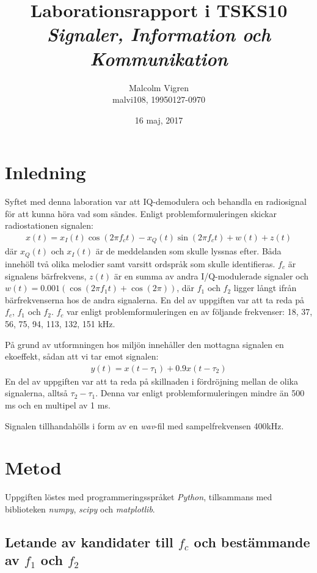 \documentclass[10pt,twocolumn]{article}
\title{Laborationsrapport i TSKS10 \emph{Signaler, Information och Kommunikation}}
\author{Malcolm Vigren \\ malvi108, 19950127-0970 }
\date{16 maj, 2017}
\begin{document}
\maketitle

\section{Inledning}

Syftet med denna laboration var att IQ-demodulera och behandla en radiosignal
för att kunna höra vad som sändes. Enligt problemformuleringen skickar
radiostationen signalen:
\begin{align*}
    x(t) = x_I(t)\cos(2 \pi f_c t) - x_Q(t)\sin(2 \pi f_c t) + w(t) + z(t)
\end{align*}
där $x_Q(t)$ och $x_I(t)$ är de meddelanden som skulle lyssnas efter. 
Båda innehöll två olika melodier samt varsitt ordspråk som skulle identifieras.
$f_c$ är signalens bärfrekvens, $z(t)$ är en summa av andra I/Q-modulerade
signaler och $w(t) = 0.001(\cos(2 \pi f_1 t) + \cos(2 \pi))$, där $f_1$ och
$f_2$ ligger långt ifrån bärfrekvenserna hos de andra signalerna. En del av
uppgiften var att ta reda på $f_c$, $f_1$ och $f_2$. $f_c$ var enligt
problemformuleringen en av följande frekvenser: 18, 37, 56, 75, 94, 113,
132, 151 kHz.

På grund av utformningen hos miljön innehåller den mottagna signalen en
ekoeffekt, sådan att vi tar emot signalen:
\begin{align*}
    y(t) = x(t - \tau_1) + 0.9x(t - \tau_2)
\end{align*}
En del av uppgiften var att ta reda på skillnaden i fördröjning mellan 
de olika signalerna,
alltså $\tau_2 - \tau_1$. Denna var enligt problemformuleringen mindre än 500 ms
och en multipel av 1 ms.

Signalen tillhandahölls i form av en \textit{wav}-fil med sampelfrekvensen 400kHz.

\section{Metod}

Uppgiften löstes med programmeringsspråket \textit{Python}, tillsammans med
biblioteken \textit{numpy}, \textit{scipy} och \textit{matplotlib}.

\subsection{Letande av kandidater till $f_c$ och bestämmande av $f_1$ och
$f_2$}
\end{document}
